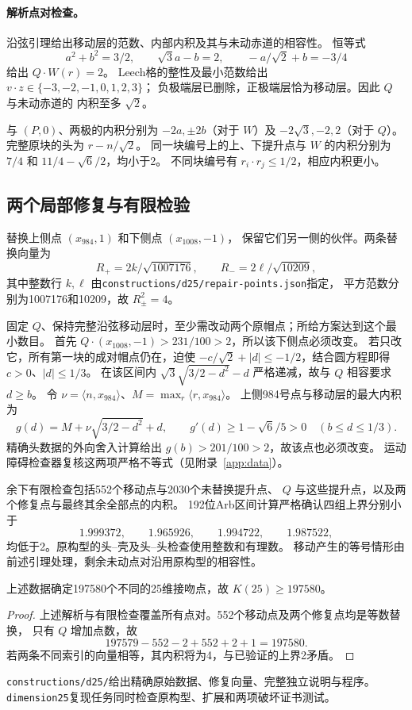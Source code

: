\paragraph{解析点对检查。}
沿弦引理给出移动层的范数、内部内积及其与未动赤道的相容性。
恒等式
\[
a^2+b^2=3/2,\qquad \sqrt3a-b=2,\qquad -a/\sqrt2+b=-3/4
\]
给出 $Q\cdot W(r)=2$。
Leech格的整性及最小范数给出 $v\cdot z\in\{-3,-2,-1,0,1,2,3\}$；
负极端层已删除，正极端层恰为移动层。因此 $Q$ 与未动赤道的
内积至多 $\sqrt2$。

与 $(P,0)$、两极的内积分别为
$-2a,\pm2b$（对于 $W$）及 $-2\sqrt3,-2,2$（对于 $Q$）。
完整原块的头为 $r-n/\sqrt2$。
同一块编号上的上、下提升点与 $W$ 的内积分别为
$7/4$ 和 $11/4-\sqrt6/2$，均小于2。
不同块编号有 $r_i\cdot r_j\le1/2$，相应内积更小。
\subsection{两个局部修复与有限检验}
替换上侧点 $(x_{984},1)$ 和下侧点 $(x_{1008},-1)$，
保留它们另一侧的伙伴。两条替换向量为
\[
R_+=2k/\sqrt{1007176},\qquad R_-=2\ell/\sqrt{10209},
\]
其中整数行 $k,\ell$ 由\texttt{constructions/d25/repair-points.json}指定，
平方范数分别为1007176和10209，故 $R_\pm^2=4$。

固定 $Q$、保持完整沿弦移动层时，至少需改动两个原帽点；所给方案达到这个最小数目。
首先 $Q\cdot(x_{1008},-1)>231/100>2$，所以该下侧点必须改变。
若只改它，所有第一块的成对帽点仍在，迫使
$-c/\sqrt2+|d|\le-1/2$，结合圆方程即得 $c>0$、$|d|\le1/3$。
在该区间内 $\sqrt3\sqrt{3/2-d^2}-d$ 严格递减，故与 $Q$ 相容要求 $d\ge b$。
令 $\nu=\langle n,x_{984}\rangle$、$M=\max_r\langle r,x_{984}\rangle$。
上侧984号点与移动层的最大内积为
\[
g(d)=M+\nu\sqrt{3/2-d^2}+d,\qquad
g'(d)\ge1-\sqrt6/5>0\quad(b\le d\le1/3).
\]
精确头数据的外向舍入计算给出 $g(b)>201/100>2$，故该点也必须改变。
运动障碍检查器复核这两项严格不等式（见附录~\ref{app:data}）。

余下有限检查包括552个移动点与2030个未替换提升点、
$Q$ 与这些提升点，以及两个修复点与最终其余全部点的内积。
192位Arb区间计算严格确认四组上界分别小于
\[
1.999372,\qquad1.965926,\qquad1.994722,\qquad1.987522,
\]
均低于2。原构型的头--壳及头--头检查使用整数和有理数。
移动产生的等号情形由前述引理处理，剩余未动点对沿用原构型的相容性。

\begin{theorem}
上述数据确定197580个不同的25维接吻点，故 $K(25)\ge197580$。
\end{theorem}
\begin{proof}
上述解析与有限检查覆盖所有点对。552个移动点及两个修复点均是等数替换，
只有 $Q$ 增加点数，故
\[
197579-552-2+552+2+1=197580.
\]
若两条不同索引的向量相等，其内积将为4，与已验证的上界2矛盾。
\end{proof}

\texttt{constructions/d25/}给出精确原始数据、修复向量、完整独立说明与程序。
\texttt{dimension25}复现任务同时检查原构型、扩展和两项破坏证书测试。
